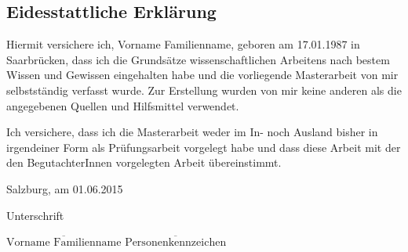 \subsection*{Eidesstattliche Erklärung}

Hiermit versichere ich, Vorname Familienname, geboren am 17.01.1987 in Saarbrücken, dass ich die Grundsätze wissenschaftlichen Arbeitens nach bestem Wissen und Gewissen eingehalten habe und die vorliegende Masterarbeit von mir selbstständig verfasst wurde. Zur Erstellung wurden von mir keine anderen als die angegebenen Quellen und Hilfsmittel verwendet. 

Ich versichere, dass ich die Masterarbeit weder im In- noch Ausland bisher in irgendeiner Form als Prüfungsarbeit vorgelegt habe und dass diese Arbeit mit der den BegutachterInnen vorgelegten Arbeit übereinstimmt.


\vspace*{3cm}

Salzburg, am 01.06.2015


\hfill


Unterschrift

\vspace*{1cm}

$\overline{\text{Vorname Familienname}}$ \hfill	$\overline{\text{Personenkennzeichen}}$

